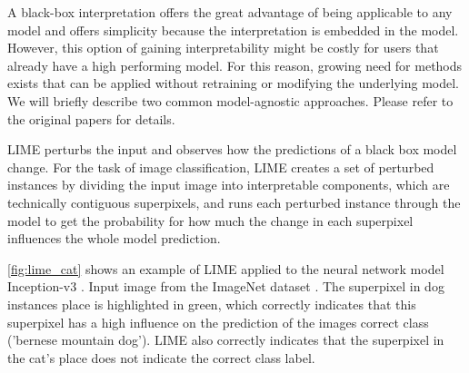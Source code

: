 A black-box interpretation offers the great advantage of being applicable to any model and offers simplicity because the interpretation is embedded in the model. However, this option of gaining interpretability might be costly for users that already have a high performing model. For this reason, growing need for methods exists that can be applied without retraining or modifying the underlying model.
We will briefly describe two common model-agnostic approaches. Please refer to the original papers for details.

\newline
LIME \cite{ribeiro2016should} perturbs the input and observes how the predictions of a black box model change. For the task of image classification, LIME creates a set of perturbed instances by dividing the input image into interpretable components, which are technically contiguous superpixels, and runs each perturbed instance through the model to get the probability for how much the change in each superpixel influences the whole model prediction. 

\autoref{fig:lime_cat} shows an example of LIME applied to the neural network model Inception-v3 \cite{szegedy2016rethinking}. Input image from the ImageNet dataset \cite{ILSVRC15}. The superpixel in dog instances place is highlighted in green, which correctly indicates that this superpixel has a high influence on the prediction of the images correct class ('bernese mountain dog'). LIME also correctly indicates that the superpixel in the cat's place does not indicate the correct class label.

